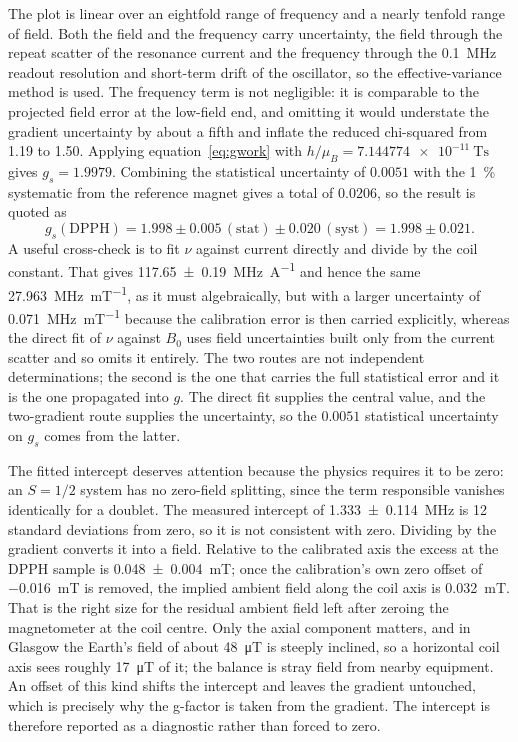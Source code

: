 \documentclass[11pt,a4paper]{article}
\begin{document}
The plot is linear over an eightfold range of frequency and a nearly tenfold range of field.
Both the field and the frequency carry uncertainty, the field through the repeat scatter of the
resonance current and the frequency through the \SI{0.1}{\mega\hertz} readout resolution and
short-term drift of the oscillator, so the effective-variance method is used. The frequency term
is not negligible: it is comparable to the projected field error at the low-field end, and
omitting it would understate the gradient uncertainty by about a fifth and inflate the reduced
chi-squared from 1.19 to 1.50. Applying equation~\eqref{eq:gwork} with
$h/\mu_B = \SI{7.144774e-11}{\tesla\second}$ gives $g_s = 1.9979$. Combining the statistical
uncertainty of $0.0051$ with the \SI{1}{\percent} systematic from the reference magnet gives a
total of $0.0206$, so the result is quoted as
\begin{equation}
g_s(\mathrm{DPPH}) = 1.998 \pm 0.005\,(\mathrm{stat}) \pm 0.020\,(\mathrm{syst}) = 1.998 \pm 0.021 .
\end{equation}
A useful cross-check is to fit $\nu$ against current directly and divide by the coil constant.
That gives \SI{117.65 \pm 0.19}{\mega\hertz\per\ampere} and hence the same
\SI{27.963}{\mega\hertz\per\milli\tesla}, as it must algebraically, but with a larger
uncertainty of \SI{0.071}{\mega\hertz\per\milli\tesla} because the calibration error is then
carried explicitly, whereas the direct fit of $\nu$ against $B_0$ uses field uncertainties built
only from the current scatter and so omits it entirely. The two routes are not independent
determinations; the second is the one that carries the full statistical error and it is the one
propagated into $g$. The direct fit supplies the central value, and the two-gradient route
supplies the uncertainty, so the $0.0051$ statistical uncertainty on $g_s$ comes from the latter.

The fitted intercept deserves attention because the physics requires it to be zero: an $S = 1/2$
system has no zero-field splitting, since the term responsible vanishes identically for a
doublet. The measured intercept of \SI{1.333 \pm 0.114}{\mega\hertz} is 12 standard deviations
from zero, so it is not consistent with zero. Dividing by the gradient converts it into a field.
Relative to the calibrated axis the excess at the DPPH sample is
\SI{+0.048 \pm 0.004}{\milli\tesla}; once the calibration's own zero offset of
\SI{-0.016}{\milli\tesla} is removed, the implied ambient field along the coil axis is
\SI{+0.032}{\milli\tesla}. That is the right size for the residual ambient field left
after zeroing the magnetometer at the coil centre. Only the axial component matters, and in
Glasgow the Earth's field of about \SI{48}{\micro\tesla} is steeply inclined, so a horizontal
coil axis sees roughly \SI{17}{\micro\tesla} of it; the balance is stray field from nearby
equipment. An offset of this kind shifts the intercept and leaves the
gradient untouched, which is precisely why the g-factor is taken from the gradient. The intercept
is therefore reported as a diagnostic rather than forced to zero.
\end{document}
